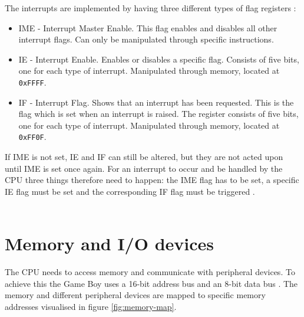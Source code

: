 The interrupts are implemented by having three different types of flag registers \cite{pandocsinterrupts}:
\begin{itemize}
    \item IME - Interrupt Master Enable. This flag enables and disables all other interrupt flags. Can only be manipulated through specific instructions.
    \item IE - Interrupt Enable. Enables or disables a specific flag. Consists of five bits, one for each type of interrupt. Manipulated through memory, located at \texttt{0xFFFF}.
    \item IF - Interrupt Flag. Shows that an interrupt has been requested. This is the flag which is set when an interrupt is raised. The register consists of five bits, one for each type of interrupt. Manipulated through memory, located at \texttt{0xFF0F}.
    \\
\end{itemize}
If IME is not set, IE and IF can still be altered, but they are not acted upon until IME is set once again. For an interrupt to occur and be handled by the CPU three things therefore need to happen: the IME flag has to be set, a specific IE flag must be set and the corresponding IF flag must be triggered \cite{pandocsinterrupts}. 
\\\\
\section{Memory and I/O devices}
\label{sec:MMUTheory}
The CPU needs to access memory and communicate with peripheral devices. To achieve this the Game Boy uses a 16-bit address bus and an 8-bit data bus \cite{TCAGBD}. The memory and different peripheral devices are mapped to specific memory addresses visualised in figure \ref{fig:memory-map}.


